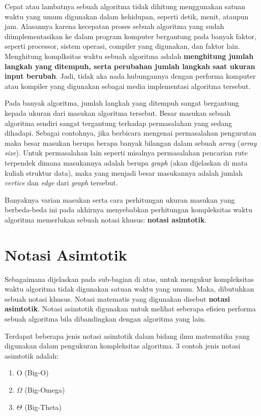 Cepat atau lambatnya sebuah algoritma tidak dihitung menggunakan satuan waktu yang umum digunakan dalam kehidupan, seperti detik, menit, ataupun jam. Alasannya karena kecepatan proses sebuah algoritma yang sudah diimplementasikan ke dalam program komputer bergantung pada banyak faktor, seperti processor, sistem operasi, compiler yang digunakan, dan faktor lain. Menghitung komplksitas waktu sebuah algoritma adalah \textbf{menghitung jumlah langkah yang ditempuh, serta perubahan jumlah langkah saat ukuran input berubah}. Jadi, tidak aka nada hubungannya dengan performa komputer atau kompiler yang digunakan sebagai media implementasi algoritma tersebut.

Pada banyak algoritma, jumlah langkah yang ditempuh sangat bergantung kepada ukuran dari masukan algoritma tersebut. Besar masukan sebuah algoritma sendiri sangat tergantung terhadap permasalahan yang sedang dihadapi. Sebagai contohnya, jika berbicara mengenai permasalahan pengurutan maka besar masukan berupa berapa banyak bilangan dalam sebuah \textit{array} (\textit{array size}). Untuk permasalahan lain seperti misalnya permasalahan pencarian rute terpendek dimana masukannya adalah berupa \textit{graph} (akan dijelaskan di mata kuliah struktur data), maka yang menjadi besar masukannya adalah jumlah \textit{vertice} dan \textit{edge} dari \textit{graph} tersebut. 

Banyaknya varian masukan serta cara perhitungan ukuran masukan yang berbeda-beda ini pada akhirnya menyebabkan perhitungan kompleksitas waktu algoritma memerlukan sebuah notasi khusus: \textbf{notasi asimtotik}.

\section{Notasi Asimtotik}

Sebagaimana dijelaskan pada sub-bagian di atas, untuk mengukur kompleksitas waktu algoritma tidak digunakan satuan waktu yang umum. Maka, dibutuhkan sebuah notasi khusus. Notasi matematis yang digunakan disebut \textbf{notasi asimtotik}. Notasi asimtotik digunakan untuk melihat seberapa efisien performa sebuah algoritma bila dibandingkan dengan algoritma yang lain. 

Terdapat beberapa jenis notasi asimtotik dalam bidang ilmu matematika yang digunakan dalam pengukuran kompleksitas algoritma. 3 contoh jenis notasi asimtotik adalah:

\begin{enumerate}
    \item O (Big-O)
    \item $\Omega$ (Big-Omega)
    \item $\Theta$ (Big-Theta)
\end{enumerate}

